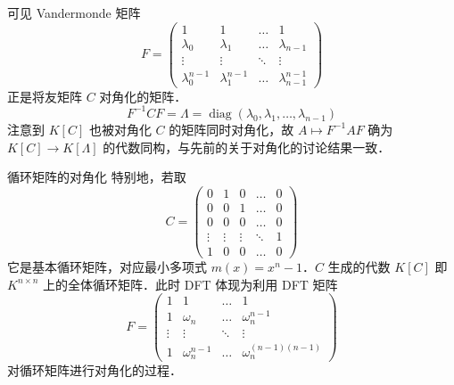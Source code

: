 \documentclass[
  ignorenonframetext,
  chinese-hans,
]{beamer}
\theoremstyle{plain}
\theoremstyle{plain}
\theoremstyle{plain}
\theoremstyle{plain}
\theoremstyle{remark}
\begin{document}
\begin{frame}{}
\label{section-1}
可见 Vandermonde 矩阵 \[
F = \begin{pmatrix}
1 & 1 & \dots & 1 \\
\lambda_0 & \lambda_1 & \dots & \lambda_{n-1} \\
\vdots & \vdots & \ddots & \vdots \\
\lambda_0^{n-1} & \lambda_1^{n-1} & \dots & \lambda_{n-1}^{n-1}
\end{pmatrix}
\] 正是将友矩阵 \(C\) 对角化的矩阵． \[
F^{-1} C F = \Lambda = \operatorname{diag}(\lambda_0,\lambda_1,\dots,\lambda_{n-1})
\] 注意到 \(K[C]\) 也被对角化 \(C\) 的矩阵同时对角化，故
\(A \mapsto F^{-1} A F\) 确为 \(K[C] \to K[\Lambda]\)
的代数同构，与先前的关于对角化的讨论结果一致．
\end{frame}

\begin{frame}{循环矩阵的对角化}
\label{ux5faaux73afux77e9ux9635ux7684ux5bf9ux89d2ux5316}
特别地，若取 \[
C = 
\begin{pmatrix}
0 & 1 & 0 &\ldots & 0\\
0 & 0 & 1 &\ldots & 0 \\
0 & 0 & 0 &\ldots & 0 \\
\vdots & \vdots & \vdots & \ddots &1\\
1 & 0 & 0 & \ldots & 0
\end{pmatrix}
\] 它是基本循环矩阵，对应最小多项式 \(m(x) = x^n - 1\)．\(C\) 生成的代数
\(K[C]\) 即 \(K^{n \times n}\) 上的全体循环矩阵．此时 DFT 体现为利用 DFT
矩阵 \[
F = \begin{pmatrix}
1 & 1 & \dots & 1 \\
1 & \omega_n & \dots & \omega_n^{n-1} \\
\vdots & \vdots & \ddots & \vdots \\
1 & \omega_n^{n-1} & \dots & \omega_n^{(n-1)(n-1)}
\end{pmatrix}
\] 对循环矩阵进行对角化的过程．
\end{frame}
\end{document}
